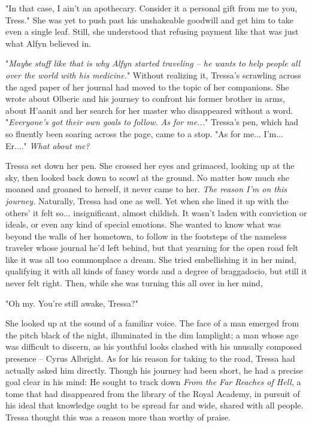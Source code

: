 "In that case, I ain't an apothecary. Consider it a personal gift from me to you, Tress." She was yet to push past his unshakeable goodwill and get him to take even a single leaf. Still, she understood that refusing payment like that was just what Alfyn believed in. 

"\emph{Maybe stuff like that is why Alfyn started traveling -- he wants to help people all over the world with his medicine.}" Without realizing it, Tressa's scrawling across the aged paper of her journal had moved to the topic of her companions. She wrote about Olberic and his journey to confront his former brother in arms, about H'aanit and her search for her master who disappeared without a word. "\emph{Everyone's got their own goals to follow. As for me...}" Tressa's pen, which had so fluently been soaring across the page, came to a stop. "As for me... I'm... Er...." \emph{What about me?}

Tressa set down her pen. She crossed her eyes and grimaced, looking up at the sky, then looked back down to scowl at the ground. No matter how much she moaned and groaned to herself, it never came to her. \emph{The reason I'm on this journey.} Naturally, Tressa had one as well. Yet when she lined it up with the others' it felt so... insignificant, almost childish. It wasn't laden with conviction or ideals, or even any kind of special emotions. She wanted to know what was beyond the walls of her hometown, to follow in the footsteps of the nameless traveler whose journal he'd left behind, but that yearning for the open road felt like it was all too commonplace a dream. She tried embellishing it in her mind, qualifying it with all kinds of fancy words and a degree of braggadocio, but still it never felt right. Then, while she was turning this all over in her mind,

"Oh my. You're still awake, Tressa?" 

She looked up at the sound of a familiar voice. The face of a man emerged from the pitch black of the night, illuminated in the dim lamplight; a man whose age was difficult to discern, as his youthful looks clashed with his unusally composed presence -- Cyrus Albright. As for his reason for taking to the road, Tressa had actually asked him directly. Though his journey had been short, he had a precise goal clear in his mind: He sought to track down \emph{From the Far Reaches of Hell}, a tome that had disappeared from the library of the Royal Academy, in pursuit of his ideal that knowledge ought to be spread far and wide, shared with all people. Tressa thought this was a reason more than worthy of praise.

